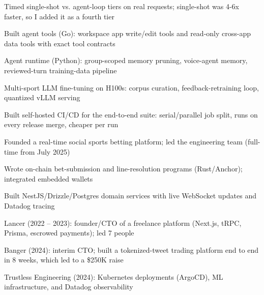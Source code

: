 \documentclass[print]{jack-resume}
\begin{document}
\begin{tightemize}
    \item Timed single-shot vs. agent-loop tiers on real requests; single-shot was 4-6x faster, so I added it as a fourth tier
    \item Built agent tools (Go): workspace app write/edit tools and read-only cross-app data tools with exact tool contracts
    \item Agent runtime (Python): group-scoped memory pruning, voice-agent memory, reviewed-turn training-data pipeline
    \item Multi-sport LLM fine-tuning on H100s: corpus curation, feedback-retraining loop, quantized vLLM serving
    \item Built self-hosted CI/CD for the end-to-end suite: serial/parallel job split, runs on every release merge, cheaper per run
\end{tightemize}
\sectionsep

\begin{tightemize}
    \item Founded a real-time social sports betting platform; led the engineering team (full-time from July 2025)
    \item Wrote on-chain bet-submission and line-resolution programs (Rust/Anchor); integrated embedded wallets
    \item Built NestJS/Drizzle/Postgres domain services with live WebSocket updates and Datadog tracing
\end{tightemize}
\sectionsep

\begin{tightemize}
    \item Lancer (2022 -- 2023): founder/CTO of a freelance platform (Next.js, tRPC, Prisma, escrowed payments); led 7 people
    \item Banger (2024): interim CTO; built a tokenized-tweet trading platform end to end in 8 weeks, which led to a \$250K raise
    \item Trustless Engineering (2024): Kubernetes deployments (ArgoCD), ML infrastructure, and Datadog observability
\end{tightemize}
\sectionsep
\end{document}
